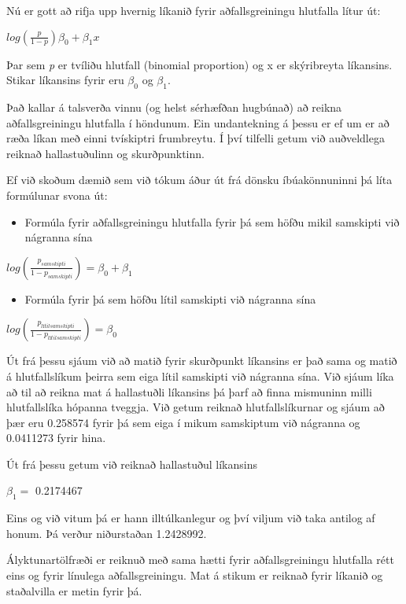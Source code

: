 \documentclass[]{book}
\providecommand{\tightlist}{%
  \setlength{\itemsep}{0pt}\setlength{\parskip}{0pt}}
\begin{document}
Nú er gott að rifja upp hvernig líkanið fyrir aðfallsgreiningu hlutfalla lítur út:

\(log(\frac{p}{1-p} ) \beta_{0}+\beta_{1}x\)

Þar sem \emph{p} er tvíliðu hlutfall (binomial proportion) og x er skýribreyta líkansins. Stikar líkansins fyrir eru \(\beta_{0}\) og \(\beta_{1}\).

Það kallar á talsverða vinnu (og helst sérhæfðan hugbúnað) að reikna aðfallsgreiningu hlutfalla í höndunum. Ein undantekning á þessu er ef um er að ræða líkan með einni tvískiptri frumbreytu. Í því tilfelli getum við auðveldlega reiknað hallastuðulinn og skurðpunktinn.

Ef við skoðum dæmið sem við tókum áður út frá dönsku íbúakönnuninni þá líta formúlunar svona út:

\begin{itemize}
\tightlist
\item
  Formúla fyrir aðfallsgreiningu hlutfalla fyrir þá sem höfðu mikil samskipti við nágranna sína
\end{itemize}

\(log(\frac{p_{samskipti} }{1-p_{samskipti}} )=\beta_{0}+\beta_{1}\)

\begin{itemize}
\tightlist
\item
  Formúla fyrir þá sem höfðu lítil samskipti við nágranna sína
\end{itemize}

\(log(\frac{p_{lítilsamskipti} }{1-p_{lítilsamskipti}} )=\beta_{0}\)

Út frá þessu sjáum við að matið fyrir skurðpunkt líkansins er það sama og matið á hlutfallslíkum þeirra sem eiga lítil samskipti við nágranna sína. Við sjáum líka að til að reikna mat á hallastuðli líkansins þá þarf að finna mismuninn milli hlutfallslíka hópanna tveggja. Við getum reiknað hlutfallslíkurnar og sjáum að þær eru 0.258574 fyrir þá sem eiga í mikum samskiptum við nágranna og 0.0411273 fyrir hina.

Út frá þessu getum við reiknað hallastuðul líkansins

\(\beta_{1}=\) 0.2174467

Eins og við vitum þá er hann illtúlkanlegur og því viljum við taka antilog af honum. Þá verður niðurstaðan 1.2428992.

Ályktunartölfræði er reiknuð með sama hætti fyrir aðfallsgreiningu hlutfalla rétt eins og fyrir línulega aðfallsgreiningu. Mat á stikum er reiknað fyrir líkanið og staðalvilla er metin fyrir þá.
\end{document}
